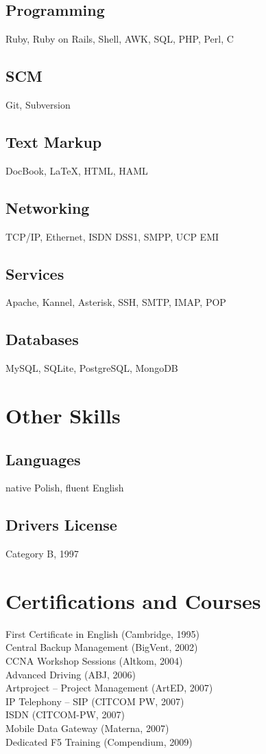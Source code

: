 \documentclass[9pt,a4paper,twocolumn]{extarticle}
\begin{document}
\subsection*{Programming}
Ruby, Ruby on Rails, Shell, AWK, SQL, PHP, Perl, C
\subsection*{SCM}
Git, Subversion
\subsection*{Text Markup}
DocBook, \LaTeX, HTML, HAML
\subsection*{Networking}
TCP/IP, Ethernet, ISDN DSS1, SMPP, UCP EMI
\subsection*{Services}
Apache, Kannel, Asterisk, SSH, SMTP, IMAP, POP
\subsection*{Databases}
MySQL, SQLite, PostgreSQL, MongoDB

\section*{Other Skills}
\subsection*{Languages}
native Polish, fluent English
\subsection*{Drivers License}
Category B, 1997

\section*{Certifications and Courses}

First Certificate in English (Cambridge, 1995)\\
Central Backup Management (BigVent, 2002)\\
CCNA Workshop Sessions (Altkom, 2004)\\
Advanced Driving (ABJ, 2006)\\
Artproject – Project Management (ArtED, 2007)\\
IP Telephony – SIP (CITCOM PW, 2007)\\
ISDN (CITCOM-PW, 2007)\\
Mobile Data Gateway (Materna, 2007)\\
Dedicated F5 Training (Compendium, 2009)\\
\end{document}

